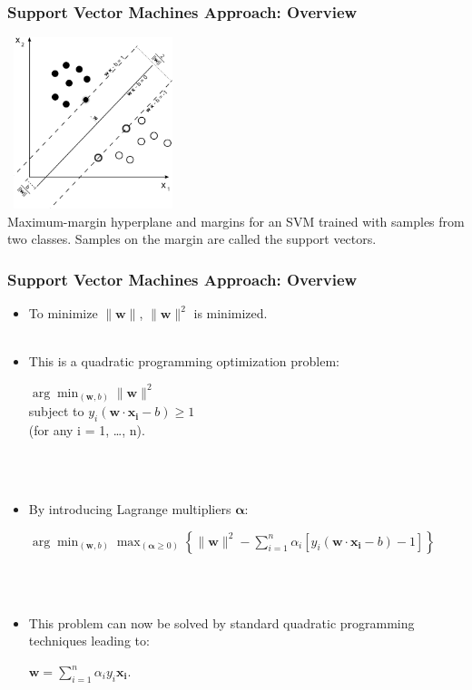 \documentclass[12pt,xcolor=dvipsnames,table,titlepage]{beamer}
\begin{document}
\begin{frame}[t]
\frametitle{Support Vector Machines Approach: Overview \cite{svm}}
\begin{center}
\includegraphics[width=5cm, height=5cm]{images/svm2}
\\Maximum-margin hyperplane and margins for an SVM trained with samples from two classes. Samples on the margin are called the support vectors.
\end{center}
\end{frame}

\begin{frame}[t]
\frametitle{Support Vector Machines Approach: Overview \cite{svm}}
\begin{itemize}
 \item To minimize $\|\mathbf{w}\|$, $\|\mathbf{w}\|^2$ is minimized.
 \  \\
 \  \\
 \item This is a quadratic programming optimization problem:
\begin{center}
$\arg\min_{(\mathbf{w},b)}\|\mathbf{w}\|^2$
\\ subject to $y_i(\mathbf{w}\cdot\mathbf{x_i} - b) \ge 1$ \\ (for any i = 1, \dots, n).
\end{center}
\  \\
\  \\
\item By introducing Lagrange multipliers $\boldsymbol{\alpha}$:

\begin{center}
$\arg\min_{(\mathbf{w},b)} \max_{(\boldsymbol{\alpha}\geq 0)} \left\{ \|\mathbf{w}\|^2 - \sum_{i=1}^{n}{\alpha_i[y_i(\mathbf{w}\cdot \mathbf{x_i} - b)-1]} \right\}$
\end{center}
\  \\
\  \\
\item This problem can now be solved by standard quadratic programming techniques leading to:
\begin{center}
$\mathbf{w} = \sum_{i=1}^n{\alpha_i y_i\mathbf{x_i}}$.\\
\end{center}
\end{itemize}
\end{frame}
\end{document}
